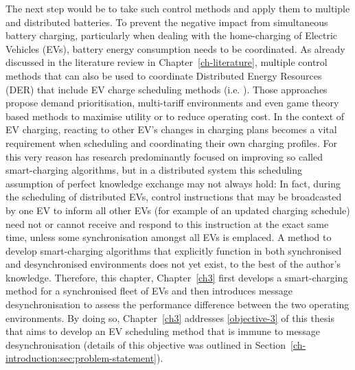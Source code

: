 The next step would be to take such control methods and apply them to multiple and distributed batteries.
To prevent the negative impact from simultaneous battery charging, particularly when dealing with the home-charging of Electric Vehicles (EVs), battery energy consumption needs to be coordinated.
As already discussed in the literature review in Chapter~\ref{ch-literature}, multiple control methods that can also be used to coordinate Distributed Energy Resources (DER) that include EV charge scheduling methods (i.e. \cite{Atia2016, Bidram2012, Bidram2014, Dolan2012, Gill2014, Guerrero2008, Guerrero2013, Sugihara2013, Toledo2013, Wang2016, Vovos2007, Guerrero2013a, Mansouri-Samani1993, Marra2013, Mokhtari2013}). 
Those approaches propose demand prioritisation, multi-tariff environments and even game theory based methods to maximise utility or to reduce operating cost.
In the context of EV charging, reacting to other EV's changes in charging plans becomes a vital requirement when scheduling and coordinating their own charging profiles.
For this very reason has research predominantly focused on improving so called smart-charging algorithms, but in a distributed system this scheduling assumption of perfect knowledge exchange may not always hold:
In fact, during the scheduling of distributed EVs, control instructions that may be broadcasted by one EV to inform all other EVs (for example of an updated charging schedule) need not or cannot receive and respond to this instruction at the exact same time, unless some synchronisation amongst all EVs is emplaced.
A method to develop smart-charging algorithms that explicitly function in both synchronised and desynchronised environments does not yet exist, to the best of the author's knowledge.
Therefore, this chapter, Chapter~\ref{ch3} first develops a smart-charging method for a synchronised fleet of EVs and then introduces message desynchronisation to assess the performance difference between the two operating environments.
By doing so, Chapter~\ref{ch3} addresses \ref{objective-3} of this thesis that aims to develop an EV scheduling method that is immune to message desynchronisation (details of this objective was outlined in Section~\ref{ch-introduction:sec:problem-statement}).

